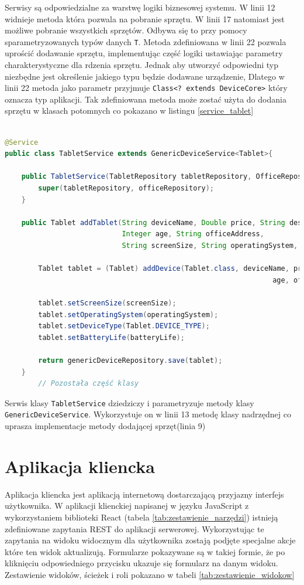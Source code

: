 Serwisy są odpowiedzialne za warstwę logiki biznesowej systemu. W linii 12 widnieje metoda która pozwala na pobranie sprzętu. W linii 17 natomiast jest możliwe pobranie wszystkich sprzętów. Odbywa się to przy pomocy sparametryzowanych typów danych \texttt{T}. Metoda zdefiniowana w linii 22 pozwala uprościć dodawanie sprzętu, implementując część logiki ustawiając parametry charakterystyczne dla rdzenia sprzętu. Jednak aby utworzyć odpowiedni typ niezbędne jest określenie jakiego typu będzie dodawane urządzenie, Dlatego w linii 22 metoda jako parametr przyjmuje \texttt{Class<? extends DeviceCore>} który oznacza typ aplikacji. Tak zdefiniowana metoda może zostać użyta do dodania sprzętu w klasach potomnych co pokazano w listingu \ref{service_tablet}

\begin{lstlisting}[language=Java, style=JavaStyle,  caption={Klasa potomna serwisu tabletu: TabletService }, label={service_tablet}]

@Service
public class TabletService extends GenericDeviceService<Tablet>{

    public TabletService(TabletRepository tabletRepository, OfficeRepository officeRepository){
        super(tabletRepository, officeRepository);
    }

    public Tablet addTablet(String deviceName, Double price, String description,
                            Integer age, String officeAddress,
                            String screenSize, String operatingSystem, String batteryLife){

        Tablet tablet = (Tablet) addDevice(Tablet.class, deviceName, price, description,
                                                                age, officeAddress);

        tablet.setScreenSize(screenSize);
        tablet.setOperatingSystem(operatingSystem);
        tablet.setDeviceType(Tablet.DEVICE_TYPE);
        tablet.setBatteryLife(batteryLife);

        return genericDeviceRepository.save(tablet);
    }
		// Pozostała część klasy
\end{lstlisting}

Serwis klasy \texttt{TabletService} dziedziczy i parametryzuje metody klasy \texttt{GenericDeviceService}. Wykorzystuje on w linii 13 metodę klasy nadrzędnej co uprasza implementacje metody dodającej sprzęt(linia 9)



\section {Aplikacja kliencka}
Aplikacja kliencka jest aplikacją internetową dostarczającą przyjazny interfejs użytkownika. W aplikacji klienckiej napisanej w języku JavaScript z wykorzystaniem biblioteki React (tabela \ref{tab:zestawienie_narzędzi}) istnieją zdefiniowane zapytania REST do aplikacji serwerowej. Wykorzystując te zapytania na widoku widocznym dla użytkownika zostają podjęte specjalne akcje które ten widok aktualizują. Formularze pokazywane są w takiej formie, że po kliknięciu odpowiedniego przycisku ukazuje się formularz na danym widoku. Zestawienie widoków, ścieżek i roli pokazano w tabeli \ref{tab:zestawienie_widokow}

